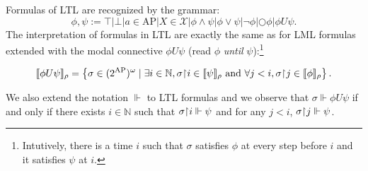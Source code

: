 \documentclass{tufte-handout} %
\theoremstyle{definition}
\theoremstyle{remark}
\newcommand{\N}{\mathbb{N}}
\newcommand{\0}{\textsf{0}}
\newcommand{\1}{\textsf{1}}
\newcommand{\mX}{\mathcal{X}}
\newcommand{\AP}{\text{AP}}
\newcommand{\rest}[2]{#1 \kern-0.65ex\upharpoonright \kern-0.55ex #2}
\newcommand{\sem}[2]{\llbracket #1 \rrbracket_{#2}}
\begin{document}
Formulas of LTL are recognized by the grammar:
\[\phi, \psi := \top | \bot | a \in \AP | X \in \mX | \phi \wedge \psi | \phi \vee \psi | \neg \phi | \bigcirc \phi | \phi U \psi.\]
The interpretation of formulas in LTL are exactly the same as for LML formulas extended with the modal connective $\phi U \psi$ (read $\phi$ \textit{until} $\psi$):\footnote{Intutively, there is a time $i$ such that $\sigma$ satisfies $\phi$ at every step before $i$ and it satisfies $\psi$ at $i$.}

\[\sem{\phi U \psi}{\rho} = \left\{ \sigma \in (2^{\AP})^{\omega} \mid \exists i \in \N, \rest{\sigma}{i} \in \sem{\psi}{\rho} \text{ and } \forall j<i, \rest{\sigma}{j} \in \sem{\phi}{\rho} \right\}.\]

We also extend the notation $\Vdash$ to LTL formulas and we observe that $\sigma \Vdash \phi U \psi$ if and only if there exists $i \in \N$ such that $\rest{\sigma}{i} \Vdash \psi$ and for any $j<i$, $\rest{\sigma}{j} \Vdash \psi$.
\end{document}
